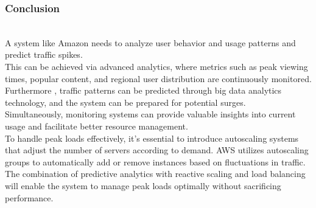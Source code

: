 \subsubsection{Conclusion}\label{BjhqMPplxgVRqKm1BR7Xm}
\\
A system like Amazon needs to analyze user behavior and usage patterns and predict traffic spikes.
\\
This can be achieved via advanced analytics, where metrics such as peak viewing times, popular content, and regional user distribution are continuously monitored. Furthermore , traffic patterns can be predicted through big data analytics technology, and the system can be prepared for potential surges.
\\
Simultaneously, monitoring systems can provide valuable insights into current usage and facilitate better resource management.
\\
To handle peak loads effectively, it's essential to introduce autoscaling systems that adjust the number of servers according to demand. AWS utilizes autoscaling groups to automatically add or remove instances based on fluctuations in traffic.
\\
The combination of predictive analytics with reactive scaling and load balancing will enable the system to manage peak loads optimally without sacrificing performance.

